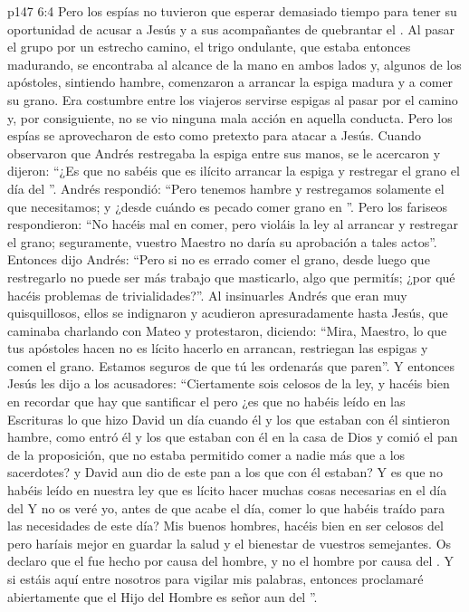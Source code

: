\vs p147 6:4 Pero los espías no tuvieron que esperar demasiado tiempo para tener su oportunidad de acusar a Jesús y a sus acompañantes de quebrantar el . Al pasar el grupo por un estrecho camino, el trigo ondulante, que estaba entonces madurando, se encontraba al alcance de la mano en ambos lados y, algunos de los apóstoles, sintiendo hambre, comenzaron a arrancar la espiga madura y a comer su grano. Era costumbre entre los viajeros servirse espigas al pasar por el camino y, por consiguiente, no se vio ninguna mala acción en aquella conducta. Pero los espías se aprovecharon de esto como pretexto para atacar a Jesús. Cuando observaron que Andrés restregaba la espiga entre sus manos, se le acercaron y dijeron: “¿Es que no sabéis que es ilícito arrancar la espiga y restregar el grano el día del ”. Andrés respondió: “Pero tenemos hambre y restregamos solamente el que necesitamos; y ¿desde cuándo es pecado comer grano en ”. Pero los fariseos respondieron: “No hacéis mal en comer, pero violáis la ley al arrancar y restregar el grano; seguramente, vuestro Maestro no daría su aprobación a tales actos”. Entonces dijo Andrés: “Pero si no es errado comer el grano, desde luego que restregarlo no puede ser más trabajo que masticarlo, algo que permitís; ¿por qué hacéis problemas de trivialidades?”. Al insinuarles Andrés que eran muy quisquillosos, ellos se indignaron y acudieron apresuradamente hasta Jesús, que caminaba charlando con Mateo y protestaron, diciendo: “Mira, Maestro, lo que tus apóstoles hacen no es lícito hacerlo en  arrancan, restriegan las espigas y comen el grano. Estamos seguros de que tú les ordenarás que paren”. Y entonces Jesús les dijo a los acusadores: “Ciertamente sois celosos de la ley, y hacéis bien en recordar que hay que santificar el  pero ¿es que no habéis leído en las Escrituras lo que hizo David un día cuando él y los que estaban con él sintieron hambre, como entró él y los que estaban con él en la casa de Dios y comió el pan de la proposición, que no estaba permitido comer a nadie más que a los sacerdotes? y David aun dio de este pan a los que con él estaban? Y es que no habéis leído en nuestra ley que es lícito hacer muchas cosas necesarias en el día del  Y no os veré yo, antes de que acabe el día, comer lo que habéis traído para las necesidades de este día? Mis buenos hombres, hacéis bien en ser celosos del  pero haríais mejor en guardar la salud y el bienestar de vuestros semejantes. Os declaro que el  fue hecho por causa del hombre, y no el hombre por causa del . Y si estáis aquí entre nosotros para vigilar mis palabras, entonces proclamaré abiertamente que el Hijo del Hombre es señor aun del ”.
